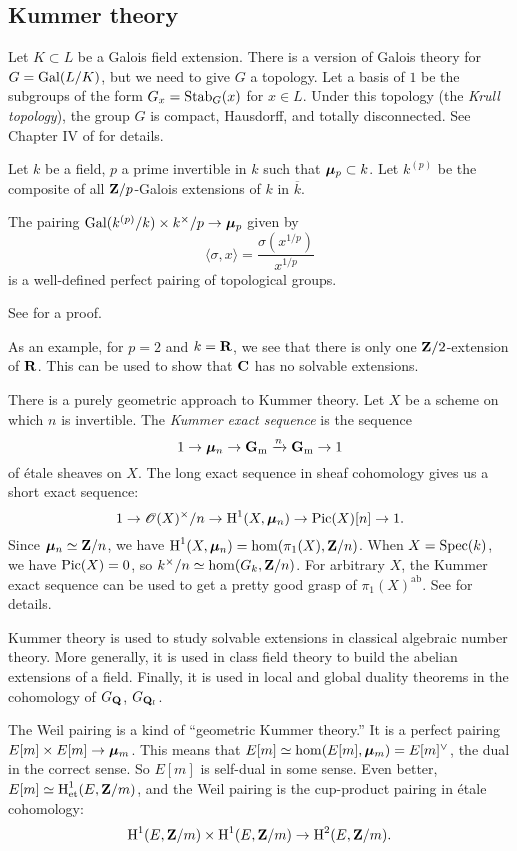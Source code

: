 \subsection{Kummer theory}

Let $K\subset L$ be a Galois field extension. There is a version of Galois 
theory for $G=\operatorname{Gal}(L/K)$, but we need to give $G$ a topology. Let a basis 
of $1$ be the subgroups of the form $G_x=\operatorname{Stab}_G(x)$ for $x\in L$. Under 
this topology (the \emph{Krull topology}), the group $G$ is compact, Hausdorff, 
and totally disconnected. See Chapter IV of \cite{neukirch-1999} for details. 

Let $k$ be a field, $p$ a prime invertible in $k$ such that ${\bm\mu}_p\subset k$. 
Let $k^{(p)}$ be the composite of all $\mathbf{Z}/p$-Galois extensions of $k$ in 
$\overline k$. 

\begin{theorem}
The pairing $\operatorname{Gal}(k^{(p)}/k)\times k^\times/p \to {\bm\mu}_p$ given by 
\[
  \langle \sigma,x\rangle = \frac{\sigma(x^{1/p})}{x^{1/p}} 
\]
is a well-defined perfect pairing of topological groups. 
\end{theorem}

See \cite[IV \S 3]{neukirch-1999} for a proof. 

As an example, for $p=2$ and $k=\mathbf{R}$, we see that there is only one 
$\mathbf{Z}/2$-extension of $\mathbf{R}$. This can be used to show that $\mathbf{C}$ has no solvable 
extensions. 

There is a purely geometric approach to Kummer theory. Let $X$ be a scheme 
on which $n$ is invertible. The \emph{Kummer exact sequence} is the sequence 
\[
  1 \to {\bm\mu}_n \to \mathbf{G}_\mathrm{m} \xrightarrow n \mathbf{G}_\mathrm{m} \to 1 
\]
of \'etale sheaves on $X$. The long exact sequence in sheaf cohomology gives 
us a short exact sequence: 
\[
  1 \to \mathscr{O}(X)^\times/n \to \operatorname{H}^1(X,{\bm\mu}_n) \to \operatorname{Pic}(X)[n] \to 1 .
\]
Since ${\bm\mu}_n\simeq \mathbf{Z}/n$, we have $\operatorname{H}^1(X,{\bm\mu}_n)=\hom(\pi_1(X),\mathbf{Z}/n)$. 
When $X=\operatorname{Spec}(k)$, we have $\operatorname{Pic}(X)=0$, so 
$k^\times/n\simeq \hom(G_k,\mathbf{Z}/n)$. For arbitrary $X$, the Kummer exact 
sequence can be used to get a pretty good grasp of $\pi_1(X)^\mathrm{ab}$. 
See \cite[5.8.3]{szamuely-2009} for details. 

Kummer theory is used to study solvable extensions in classical algebraic 
number theory. More generally, it is used in class field theory to build the 
abelian extensions of a field. Finally, it is used in local and global duality 
theorems in the cohomology of $G_{\mathbf{Q}}$, $G_{\mathbf{Q}_l}$. 

The Weil pairing is a kind of ``geometric Kummer theory.'' It is a perfect 
pairing $E[m]\times E[m]\to {\bm\mu}_m$. This means that 
$E[m]\simeq \hom(E[m],{\bm\mu}_m)=E[m]^\vee$, the dual in the correct sense. So 
$E[m]$ is self-dual in some sense. Even better, 
$E[m]\simeq \operatorname{H}^1_\mathrm{et}(E,\mathbf{Z}/m)$, and the Weil pairing is the cup-product 
pairing in \'etale cohomology: 
\[
  \operatorname{H}^1(E,\mathbf{Z}/m)\times \operatorname{H}^1(E,\mathbf{Z}/m) \to \operatorname{H}^2(E,\mathbf{Z}/m).
\]




